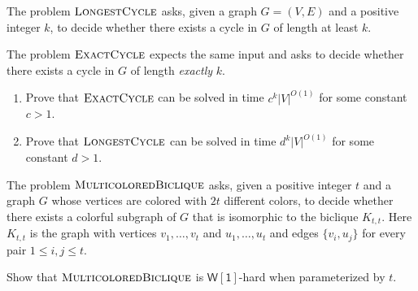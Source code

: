\begin{exercise}[6+6 Points]
The problem $\textsc{LongestCycle}$ asks, given a graph $G=(V,E)$ and a positive integer $k$, to decide whether there exists a cycle in $G$ of length at least $k$. 

\noindent The problem $\textsc{ExactCycle}$ expects the same input and asks to decide whether there exists a cycle in $G$ of length \emph{exactly} $k$.
\begin{enumerate}
\item Prove that $\textsc{ExactCycle}$ can be solved in time $c^k |V|^{O(1)}$ for some constant $c>1$.
\item Prove that $\textsc{LongestCycle}$ can be solved in time $d^{k} |V|^{O(1)}$ for some constant $d>1$.
\end{enumerate}
\end{exercise}

\begin{exercise}[12 Points]
The problem $\textsc{MulticoloredBiclique}$ asks, given a positive integer $t$ and a graph $G$ whose vertices are colored with $2t$ different colors, to decide whether there exists a colorful subgraph of $G$ that is isomorphic to the biclique $K_{t,t}$. Here $K_{t,t}$ is the graph with vertices $v_1,\dots,v_t$ and $u_1,\dots,u_t$ and edges $\{v_i,u_j\}$ for every pair $1\leq i,j \leq t$.

Show that $\textsc{MulticoloredBiclique}$ is $\mathsf{W[1]}$-hard when parameterized by $t$.
\end{exercise}

